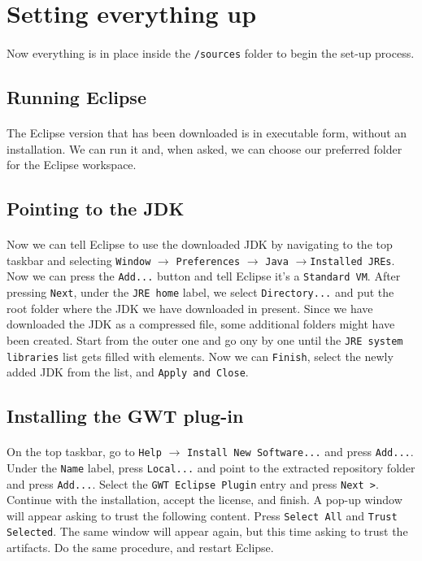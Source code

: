 \section{Setting everything up}
\paragraph{}
Now everything is in place inside the \verb|/sources| folder to begin the set-up process.
\subsection{Running Eclipse}
\paragraph{}
The Eclipse version that has been downloaded is in executable form, without an installation. We can run it and, when asked, we can choose our preferred folder for the Eclipse workspace.
\subsection{Pointing to the JDK}
\paragraph{}
Now we can tell Eclipse to use the downloaded JDK by navigating to the top taskbar and selecting \verb|Window| $\longrightarrow$ \verb|Preferences| $\longrightarrow$ \verb|Java| $\longrightarrow$\newline \verb|Installed JREs|. Now we can press the \verb|Add...| button and tell Eclipse it's a \verb|Standard VM|. After pressing \verb|Next|, under the \verb|JRE home| label, we select \verb|Directory...| and put the root folder where the JDK we have downloaded in present. Since we have downloaded the JDK as a compressed file, some additional folders might have been created. Start from the outer one and go ony by one until the \verb|JRE system libraries| list gets filled with elements. Now we can \verb|Finish|, select the newly added JDK from the list, and \verb|Apply and Close|.
\subsection{Installing the GWT plug-in}
\paragraph{}
On the top taskbar, go to \verb|Help| $\longrightarrow$ \verb|Install New Software...| and press \verb|Add...|. Under the \verb|Name| label, press \verb|Local...| and point to the extracted repository folder and press \verb|Add...|. Select the \verb|GWT Eclipse Plugin| entry and press \verb|Next >|. Continue with the installation, accept the license, and finish. A pop-up window will appear asking to trust the following content. Press \verb|Select All| and \verb|Trust Selected|. The same window will appear again, but this time asking to trust the artifacts. Do the same procedure, and restart Eclipse.
